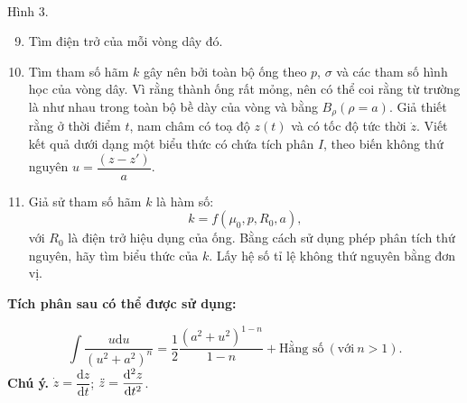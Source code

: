 \begin{vd}
\begin{center}
\begin{tikzpicture}[x=0.75pt,y=0.75pt,yscale=-1,xscale=1]
\end{tikzpicture}\\
Hình $3$.
\end{center}
\begin{enumerate}[1) ]
\setcounter{enumi}{8}
    \item Tìm điện trở của mỗi vòng dây đó.
    \item Tìm tham số hãm $k$  gây nên bởi toàn bộ ống theo $p$, $\sigma$ và các tham số hình học của vòng dây. Vì rằng thành ống rất mỏng, nên có thể coi rằng từ trường là như nhau trong toàn bộ bề dày của vòng và bằng $B_{\rho}(\rho=a)$. Giả thiết rằng ở thời điểm $t$, nam châm có toạ độ $z(t)$ và có tốc độ tức thời $\Dot{z}$. Viết kết quả dưới dạng một biểu thức có chứa tích phân $I$, theo biến không thứ nguyên $u=\dfrac{(z-z')}{a}$.
    \item Giả sử tham số hãm $k$ là hàm số:
    \[k=f(\mu_0, p, R_0, a),\]
    với $R_0$ là điện trở hiệu dụng của ống. Bằng cách sử dụng phép phân tích thứ nguyên, hãy tìm biểu thức của $k$. Lấy hệ số tỉ lệ không thứ nguyên bằng đơn vị.
\end{enumerate}
\begin{center}
    \bf Tích phân sau có thể được sử dụng:
\end{center}
\[\int \dfrac{u\mathrm{d}u}{(u^2+a^2)^{n}}=\dfrac{1}{2}\dfrac{(a^2+u^2)^{1-n}}{1-n}+\text{Hằng số}~(\text{với}~n>1).\]
\textbf{Chú ý.} $\Dot{z}=\dfrac{\mathrm{d}z}{\mathrm{d}t}$; $\Ddot{z}=\dfrac{\mathrm{d}^2z}{\mathrm{d}t^2}$.
\end{vd}
